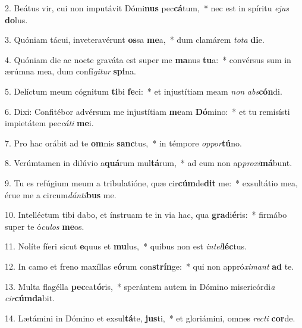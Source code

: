 2. Beátus vir, cui non imputávit Dómi\textbf{nus} pec\textbf{cá}tum,~*  nec est in spíritu \textit{e}\textit{jus} \textbf{do}lus.\

3. Quóniam tácui, inveteravérunt \textbf{os}sa \textbf{me}a,~*  dum clamárem \textit{to}\textit{ta} \textbf{di}e.\

4. Quóniam die ac nocte graváta est super me \textbf{ma}nus \textbf{tu}a:~*  convérsus sum in ærúmna mea, dum confí\textit{gi}\textit{tur} \textbf{spi}na.\

5. Delíctum meum cógnitum \textbf{ti}bi \textbf{fe}ci:~*  et injustítiam meam \textit{non} \textit{abs}\textbf{cón}di.\

6. Dixi: Confitébor advérsum me injustítiam \textbf{me}am \textbf{Dó}mino:~*  et tu remisísti impietátem pec\textit{cá}\textit{ti} \textbf{me}i.\

7. Pro hac orábit ad te \textbf{om}nis \textbf{sanc}tus,~*  in témpore \textit{op}\textit{por}\textbf{tú}no.\

8. Verúmtamen in dilúvio a\textbf{quá}rum mul\textbf{tá}rum,~*  ad eum non ap\textit{pro}\textit{xi}\textbf{má}bunt.\

9. Tu es refúgium meum a tribulatióne, quæ cir\textbf{cúm}de\textbf{dit} me:~*  exsultátio mea, érue me a circum\textit{dán}\textit{ti}\textbf{bus} me.\

10. Intelléctum tibi dabo, et ínstruam te in via hac, qua \textbf{gra}di\textbf{é}ris:~*  firmábo super te ó\textit{cu}\textit{los} \textbf{me}os.\

11. Nolíte fíeri sicut \textbf{e}quus et \textbf{mu}lus,~*  quibus non est \textit{in}\textit{tel}\textbf{léc}tus.\

12. In camo et freno maxíllas e\textbf{ó}rum con\textbf{strín}ge:~*  qui non appró\textit{xi}\textit{mant} \textbf{ad} te.\

13. Multa flagélla \textbf{pec}ca\textbf{tó}ris,~*  sperántem autem in Dómino misericórdi\textit{a} \textit{cir}\textbf{cúm}\textbf{da}bit.\

14. Lætámini in Dómino et exsul\textbf{tá}te, \textbf{jus}ti,~*  et gloriámini, omnes \textit{rec}\textit{ti} \textbf{cor}de.\

